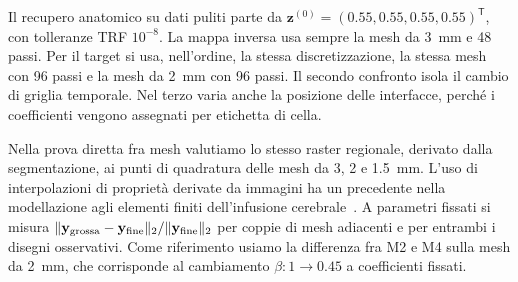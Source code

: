 Il recupero anatomico su dati puliti parte da $\mathbf z^{(0)}=(0.55,0.55,0.55,0.55)^{\mathsf T}$, con tolleranze TRF $10^{-8}$. La mappa inversa usa sempre la mesh da 3~mm e 48 passi. Per il target si usa, nell'ordine, la stessa discretizzazione, la stessa mesh con 96 passi e la mesh da 2~mm con 96 passi. Il secondo confronto isola il cambio di griglia temporale. Nel terzo varia anche la posizione delle interfacce, perché i coefficienti vengono assegnati per etichetta di cella.

Nella prova diretta fra mesh valutiamo lo stesso raster regionale, derivato dalla segmentazione, ai punti di quadratura delle mesh da 3, 2 e 1.5~mm. L'uso di interpolazioni di proprietà derivate da immagini ha un precedente nella modellazione agli elementi finiti dell'infusione cerebrale~\citep{chen2024mri}. A parametri fissati si misura $\|\mathbf y_{\rm grossa}-\mathbf y_{\rm fine}\|_2/\|\mathbf y_{\rm fine}\|_2$ per coppie di mesh adiacenti e per entrambi i disegni osservativi. Come riferimento usiamo la differenza fra M2 e M4 sulla mesh da 2~mm, che corrisponde al cambiamento $\beta:1\to0.45$ a coefficienti fissati.
